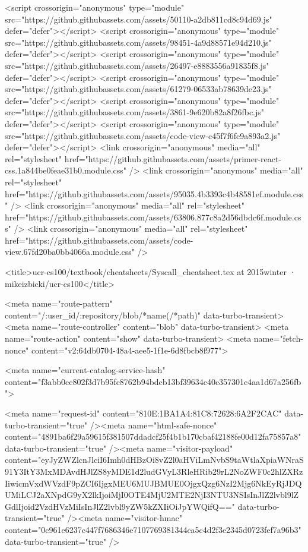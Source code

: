 <script crossorigin="anonymous" type="module" src="https://github.githubassets.com/assets/50110-a2db811cd8c94d69.js" defer="defer"></script>
<script crossorigin="anonymous" type="module" src="https://github.githubassets.com/assets/98451-4a9d88571e94d210.js" defer="defer"></script>
<script crossorigin="anonymous" type="module" src="https://github.githubassets.com/assets/26497-e8883556a91835f8.js" defer="defer"></script>
<script crossorigin="anonymous" type="module" src="https://github.githubassets.com/assets/61279-06533ab78639de23.js" defer="defer"></script>
<script crossorigin="anonymous" type="module" src="https://github.githubassets.com/assets/3861-9e620b82a8f26fbc.js" defer="defer"></script>
<script crossorigin="anonymous" type="module" src="https://github.githubassets.com/assets/code-view-c45f7f6fc9a893a2.js" defer="defer"></script>
<link crossorigin="anonymous" media="all" rel="stylesheet" href="https://github.githubassets.com/assets/primer-react-css.1a844be0feae31b0.module.css" />
<link crossorigin="anonymous" media="all" rel="stylesheet" href="https://github.githubassets.com/assets/95035.4b3393c4b48581ef.module.css" />
<link crossorigin="anonymous" media="all" rel="stylesheet" href="https://github.githubassets.com/assets/63806.877c8a2d56dbdc6f.module.css" />
<link crossorigin="anonymous" media="all" rel="stylesheet" href="https://github.githubassets.com/assets/code-view.67fd20ba0bb4066a.module.css" />


  <title>ucr-cs100/textbook/cheatsheets/Syscall_cheatsheet.tex at 2015winter · mikeizbicki/ucr-cs100</title>



  <meta name="route-pattern" content="/:user_id/:repository/blob/*name(/*path)" data-turbo-transient>
  <meta name="route-controller" content="blob" data-turbo-transient>
  <meta name="route-action" content="show" data-turbo-transient>
  <meta name="fetch-nonce" content="v2:64db0704-48a4-aee5-1f1e-6d8fbcb8f977">

    
  <meta name="current-catalog-service-hash" content="f3abb0cc802f3d7b95fc8762b94bdcb13bf39634c40c357301c4aa1d67a256fb">


  <meta name="request-id" content="810E:1BA1A4:81C8:72628:6A2F2CAC" data-turbo-transient="true" /><meta name="html-safe-nonce" content="4891ba6f29a59615f381507ddadcf25f4b1b170cbaf42188fe00d12fa75857a8" data-turbo-transient="true" /><meta name="visitor-payload" content="eyJyZWZlcnJlciI6Imh0dHBzOi8vZ2l0aHViLmNvbS9taWtlaXpiaWNraS91Y3ItY3MxMDAvdHJlZS8yMDE1d2ludGVyL3RleHRib29rL2NoZWF0c2hlZXRzIiwicmVxdWVzdF9pZCI6IjgxMEU6MUJBMUE0OjgxQzg6NzI2Mjg6NkEyRjJDQUMiLCJ2aXNpdG9yX2lkIjoiMjI0OTE4MjU2MTE2NjI3NTU3NSIsInJlZ2lvbl9lZGdlIjoid2VzdHVzMiIsInJlZ2lvbl9yZW5kZXIiOiJpYWQifQ==" data-turbo-transient="true" /><meta name="visitor-hmac" content="0c961e6237c447f7686346e7107769381344ca5c4d2f3e2345d0723fef7a96b3" data-turbo-transient="true" />


